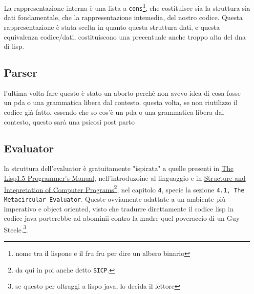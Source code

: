 \documentclass[11pt]{article}
\begin{document}
La rappresentazione interna è una lista a \texttt{cons}\footnote{nome tra il lispone e il fru fru per dire un albero binario}, che costituisce sia la struttura sia dati fondamentale, che la rappresentazione intemedia, del nostro codice.
Questa rappresentazione è stata scelta in quanto questa struttura dati, e questa equivalenza codice/dati, costituiscono una precentuale anche troppo alta del dna di lisp.

\subsection{Parser}
\label{sec:org632be9d}
l'ultima volta fare questo è stato un aborto perchè non avevo idea di cosa fosse un pda o una grammatica libera dal contesto.
questa volta, se non riutilizzo il codice già fatto, essendo che so cos'è un pda o una grammatica libera dal contesto, questo sarà una psicosi post parto

\subsection{Evaluator}
\label{sec:orgaf472c2}
la struttura dell'evaluator è gratuitamente "ispirata" a quelle presenti in
\href{https://direct.mit.edu/books/book/2851/LISP-1-5-Programmer-s-Manual}{The Lisp1.5 Programmer's Manual}, nell'introduzoine al linguaggio e in \href{https://web.mit.edu/6.001/6.037/sicp.pdf}{Structure and Intepretation of Computer Programs}\footnote{da qui in poi anche detto \texttt{SICP}.}, nel capitolo \texttt{4}, specie la sezione \texttt{4.1, The Metacircular Evaluator}.
Queste ovviamente adattate a un ambiente più imperativo e object oriented, visto che tradurre direttamente il codice lisp in codice java porterebbe ad abominii contro la madre quel poveraccio di un Guy Steele.\footnote{se questo per oltraggi a lisp\footnotemark o java\footnotemark, lo decida il lettore}.
\end{document}
